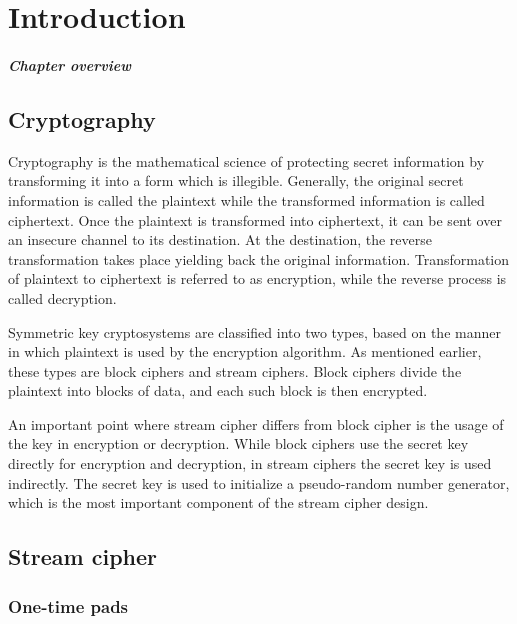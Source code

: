 \chapter{Introduction}

\paragraph{Chapter overview}


\section{Cryptography}

Cryptography is the mathematical science of protecting secret information by transforming it into a form which is illegible. Generally, the original secret information is called the plaintext while the transformed information is called ciphertext. Once the plaintext is transformed into ciphertext, it can be sent over an insecure channel to its destination. At the destination, the reverse transformation takes place yielding back the original information. Transformation of plaintext to ciphertext is referred to as encryption, while the reverse process is called decryption.


Symmetric key cryptosystems are classified into two types, based on the manner in which plaintext is used by the encryption algorithm. As mentioned earlier, these types are block ciphers and stream ciphers. Block ciphers divide the plaintext into blocks of data, and each such block is then encrypted. 



An important point where stream cipher differs from block cipher is the usage of the key in encryption or decryption. While block ciphers use the secret key directly for encryption and decryption, in stream ciphers the secret key is used indirectly. The secret key is used to initialize a pseudo-random number generator, which is the most important component of the stream cipher design. 



\section{Stream cipher}

\subsection{One-time pads} 

